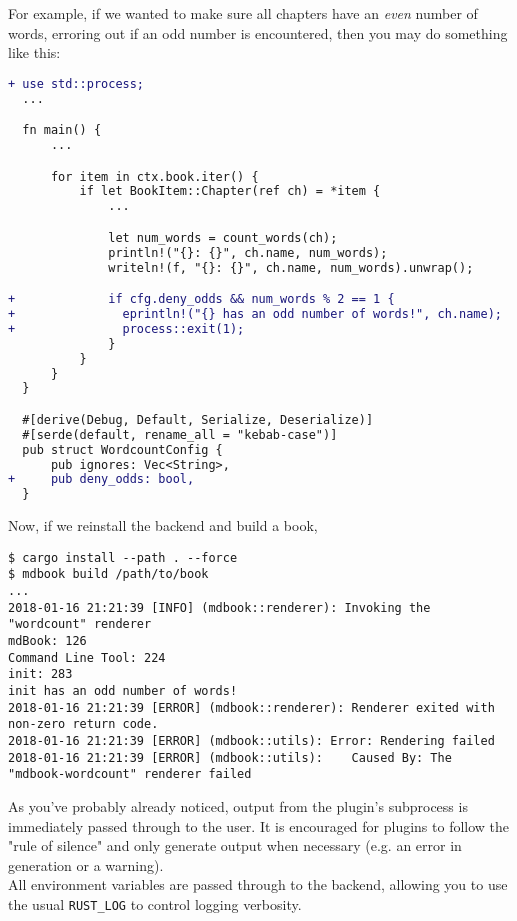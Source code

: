 \documentclass{article}
\begin{document}
For example, if we wanted to make sure all chapters have an \emph{even} number of
words, erroring out if an odd number is encountered, then you may do something
like this:\\
\begin{lstlisting}[language=diff]
+ use std::process;
  ...

  fn main() {
      ...

      for item in ctx.book.iter() {
          if let BookItem::Chapter(ref ch) = *item {
              ...

              let num_words = count_words(ch);
              println!("{}: {}", ch.name, num_words);
              writeln!(f, "{}: {}", ch.name, num_words).unwrap();

+             if cfg.deny_odds && num_words % 2 == 1 {
+               eprintln!("{} has an odd number of words!", ch.name);
+               process::exit(1);
              }
          }
      }
  }

  #[derive(Debug, Default, Serialize, Deserialize)]
  #[serde(default, rename_all = "kebab-case")]
  pub struct WordcountConfig {
      pub ignores: Vec<String>,
+     pub deny_odds: bool,
  }

\end{lstlisting}

Now, if we reinstall the backend and build a book,\\
\begin{lstlisting}[language=shell]
$ cargo install --path . --force
$ mdbook build /path/to/book
...
2018-01-16 21:21:39 [INFO] (mdbook::renderer): Invoking the "wordcount" renderer
mdBook: 126
Command Line Tool: 224
init: 283
init has an odd number of words!
2018-01-16 21:21:39 [ERROR] (mdbook::renderer): Renderer exited with non-zero return code.
2018-01-16 21:21:39 [ERROR] (mdbook::utils): Error: Rendering failed
2018-01-16 21:21:39 [ERROR] (mdbook::utils):    Caused By: The "mdbook-wordcount" renderer failed

\end{lstlisting}

As you've probably already noticed, output from the plugin's subprocess is
immediately passed through to the user. It is encouraged for plugins to follow
the "rule of silence" and only generate output when necessary (e.g. an error in
generation or a warning).\\

All environment variables are passed through to the backend, allowing you to use
the usual \lstinline|RUST_LOG| to control logging verbosity.\\
\end{document}
